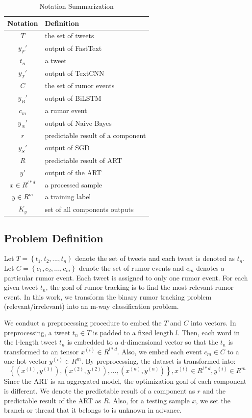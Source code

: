 \begin{table}
	\caption{Notation Summarization}
	\centering
	\label{tab:notations}
	\begin{tabular}{|c|l|}
		\hline
		\textbf{Notation} & \textbf{Definition}\\
		\hline
		$T$ & the set of tweets \\
		\hline
		$y_F'$ & output of FastText \\
		\hline
		$t_n$ & a tweet\\
		\hline		
		$y_T'$ & output of TextCNN\\
		\hline
		$C$ & the set of rumor events\\
		\hline
		$y_B'$ & output of BiLSTM\\
		\hline
		$c_m$ & a rumor event \\
		\hline
		$y_N'$ & output of Naive Bayes\\
		\hline
		$r$ & predictable result of a component\\
		\hline
		$y_S'$ & output of SGD\\
		\hline
		$R$ & predictable result of ART\\
		\hline
		$y'$& output of the ART\\
		\hline
		$x \in R^{l*d}$ & a processed sample\\
		\hline
		$y \in R^m$ & a training label\\
		\hline
		$K_y$ & set of all components outputs\\		
		\hline						
	\end{tabular}
\end{table}

\subsection{Problem Definition}
\label{sec:problem}
Let $T = \left\{t_1, t_2, ..., t_n \right\}$ denote the set of tweets and each tweet is denoted as $t_n$. Let $C = \left\{c_1, c_2, ... , c_m \right\}$ denote the set of rumor events and $c_m$ denotes a particular rumor event. Each tweet is assigned to only one rumor event. For each given tweet $t_n$, the goal of rumor tracking is to find the most relevant rumor event. In this work, we transform the binary rumor tracking problem (relevant/irrelevant) into an m-way classification problem. 

We conduct a preprocessing procedure to embed the $T$ and $C$ into vectors. In preprocessing, a tweet $t_n \in T $ is padded to a fixed length $l$. Then, each word in the l-length tweet $t_n$ is embedded to a d-dimensional vector so that the $t_n$ is transformed to an tensor $x^{(i)} \in R^{l*d}$. Also, we embed each event $c_m \in C$ to a one-hot vector $y^{(i)} \in R^m$. By preprocessing, the dataset is transformed into: $$\left\{ (x^{(1)}, y^{(1)}), (x^{(2)}, y^{(2)}),..., (x^{(n)}, y^{(n)}) \right\}, x^{(i)} \in R^{l*d}, y^{(i)} \in R^m $$ Since the ART is an aggregated model, the optimization goal of each component is different. We denote the predictable result of a component as $r$ and the predictable result of the ART as $R$. Also, for a testing sample $x$, we set the branch or thread that it belongs to is unknown in advance. 

